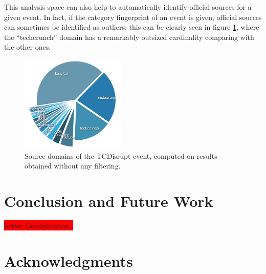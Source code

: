 \documentclass{sig-alternate}
\newcommand{\todo}[1]{\colorbox{red}{#1}}
\begin{document}
This analysis space can also help to automatically identify official sources for a given event. In fact, if the category fingerprint of an event is given, official sources can sometimes be identified as outliers: this can be clearly seen in figure \ref{fig:tcdisrupt_outlier}, where the ``techcrunch'' domain has a remarkably outsized cardinality comparing with the other ones.
\begin{figure}[htbp]
  \centering
  \includegraphics[width=5cm]{Figures/tcdisrupt_outlier.png}
  \caption{Source domains of the TCDisrupt event, computed on results obtained without any filtering.}
  \label{fig:tcdisrupt_outlier}
\end{figure}

\section{Conclusion and Future Work}
\label{sec:conclusions}
\todo{better Deduplication,.}

\section{Acknowledgments}
\label{sec:ack}

\nocite{*}


\balancecolumns
\end{document}

